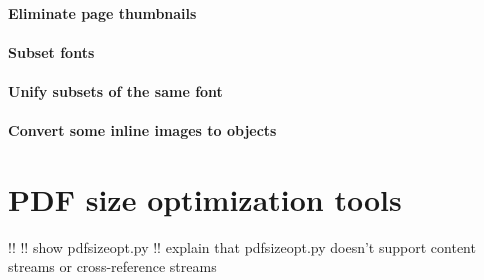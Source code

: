 \documentclass{ltugproc}
\begin{document}
\paragraph{Eliminate page thumbnails}

\paragraph{Subset fonts}

\paragraph{Unify subsets of the same font}

\paragraph{Convert some inline images to objects}

\section{PDF size optimization tools}
!!
!! show pdfsizeopt.py
!! explain that pdfsizeopt.py doesn't support content streams or cross-reference streams
\end{document}
